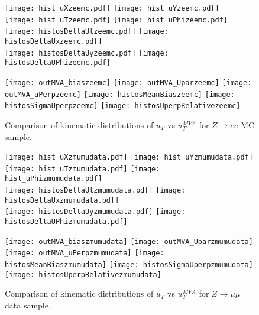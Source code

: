     
    \begin{figure}[h]
    	\centering
    	{\texttt{[image: hist\_uXzeemc.pdf]}}
    	{\texttt{[image: hist\_uYzeemc.pdf]}} \\
    	{\texttt{[image: hist\_uTzeemc.pdf]}}
    	{\texttt{[image: hist\_uPhizeemc.pdf]}}\\
    	{\texttt{[image: histosDeltaUtzeemc.pdf]}}
    	{\texttt{[image: histosDeltaUxzeemc.pdf]}} \\
    	{\texttt{[image: histosDeltaUyzeemc.pdf]}}
    	{\texttt{[image: histosDeltaUPhizeemc.pdf]}}\\
    	\label{fig:zee_mc_distributions1}
    \end{figure}
    \begin{figure}[h]
    	\centering
    	{\texttt{[image: outMVA\_biaszeemc]}}
    	{\texttt{[image: outMVA\_Uparzeemc]}}
    	{\texttt{[image: outMVA\_uPerpzeemc]}}
    	{\texttt{[image: histosMeanBiaszeemc]}}
    	{\texttt{[image: histosSigmaUperpzeemc]}}
    	{\texttt{[image: histosUperpRelativezeemc]}}
    	\caption{Comparison of kinematic distributions of $u_T$ vs $u_T^{MVA}$ for $Z\rightarrow ee$ MC sample.}
    	\label{fig:zee_mc_distributions2}
    \end{figure}


    \begin{figure}[h]
    	\centering
    	{\texttt{[image: hist\_uXzmumudata.pdf]}}
    	{\texttt{[image: hist\_uYzmumudata.pdf]}} \\
    	{\texttt{[image: hist\_uTzmumudata.pdf]}}
    	{\texttt{[image: hist\_uPhizmumudata.pdf]}}\\
    	{\texttt{[image: histosDeltaUtzmumudata.pdf]}}
    	{\texttt{[image: histosDeltaUxzmumudata.pdf]}} \\
    	{\texttt{[image: histosDeltaUyzmumudata.pdf]}}
    	{\texttt{[image: histosDeltaUPhizmumudata.pdf]}}\\
    	\label{fig:zmumu_data_distributions1}
    \end{figure}
    \begin{figure}[h]
    	\centering
    	{\texttt{[image: outMVA\_biaszmumudata]}}
    	{\texttt{[image: outMVA\_Uparzmumudata]}}
    	{\texttt{[image: outMVA\_uPerpzmumudata]}}
    	{\texttt{[image: histosMeanBiaszmumudata]}}
    	{\texttt{[image: histosSigmaUperpzmumudata]}}
    	{\texttt{[image: histosUperpRelativezmumudata]}}
    	\caption{Comparison of kinematic distributions of $u_T$ vs $u_T^{MVA}$ for $Z\rightarrow \mu\mu$ data sample.}
    	\label{fig:zmumu_data_distributions2}
    \end{figure}
    
